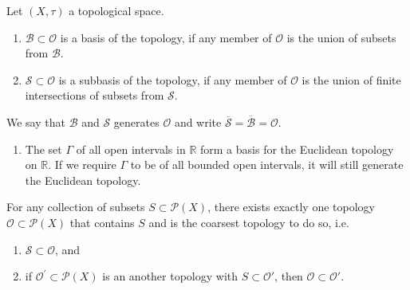 \begin{defbox}
    \begin{definition}[Base]
        Let \((X, \tau)\) a {\color{mathif}topological space}.
        \begin{enumerate}
            \item \(\mathcal{B} \subset \mathcal{O}\) is a {\color{maththen}basis} of the topology, if any member of \(\mathcal{O}\) is the {\color{mathif}union of subsets} from \(\mathcal{B}\).
            \item \(\mathcal{S} \subset \mathcal{O}\) is a {\color{maththen}subbasis} of the topology, if any member of \(\mathcal{O}\) is the {\color{mathif}union of finite intersections of subsets} from \(\mathcal{S}\).
        \end{enumerate}
        We say that \(\mathcal{B}\) and \(\mathcal{S}\) {\color{maththen}generates} \(\mathcal{O}\) and write \(\overline{\mathcal{S}} = \overline{\mathcal{B}} = \mathcal{O}\).
    \end{definition}
\end{defbox}

\begin{exmbox}
    \begin{example}
        \begin{enumerate}
            \item The set \(\Gamma\) of all open intervals in \(\mathbb{R}\) form a basis for the Euclidean topology on \(\mathbb{R}\). If we require \(\Gamma\) to be of all bounded open intervals, it will still generate the Euclidean topology.
        \end{enumerate}
    \end{example}
\end{exmbox}

\begin{thmbox}
    \begin{lemma}
    For any collection of subsets \(S \subset \mathcal{P}(X)\), there exists exactly one topology \(\mathcal{O} \subset \mathcal{P}(X)\) that contains \(S\) and is the coarsest topology to do so, i.e.
    \begin{enumerate}
        \item \(\mathcal{S} \subset \mathcal{O}\), and
        \item if \(\mathcal{O}^\prime \subset \mathcal{P}(X)\) is an another topology with \(S \subset \mathcal{O}'\), then \(\mathcal{O} \subset \mathcal{O}'\).
    \end{enumerate}
    \end{lemma}
\end{thmbox}

